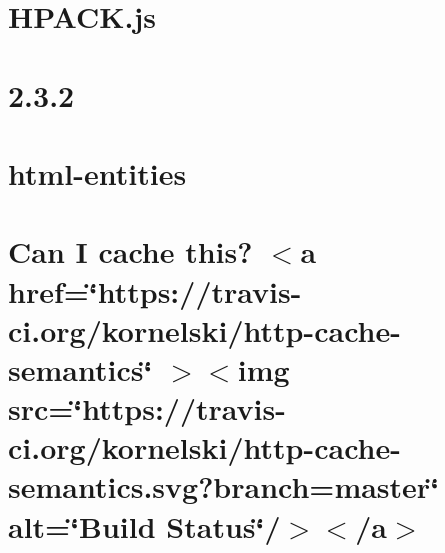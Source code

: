 \documentclass[twoside]{book}
\newcommand{\+}{\discretionary{\mbox{\scriptsize$\hookleftarrow$}}{}{}}
\begin{document}
\chapter{HPACK.\+js}
\label{md__c___users_vaishnavi_jadhav__desktop__developer_code_mean_stack_example_client_node_modules_hpack_js__r_e_a_d_m_e}

\chapter{2.3.2}
\label{md__c___users_vaishnavi_jadhav__desktop__developer_code_mean_stack_example_client_node_modules_html_entities__c_h_a_n_g_e_l_o_g}

\chapter{html-\/entities}
\label{md__c___users_vaishnavi_jadhav__desktop__developer_code_mean_stack_example_client_node_modules_html_entities__r_e_a_d_m_e}

\chapter{Can I cache this? \texorpdfstring{$<$}{<}a href=\char`\"{}https\+://travis-\/ci.\+org/kornelski/http-\/cache-\/semantics\char`\"{} \texorpdfstring{$>$}{>}\texorpdfstring{$<$}{<}img src=\char`\"{}https\+://travis-\/ci.\+org/kornelski/http-\/cache-\/semantics.\+svg?branch=master\char`\"{} alt=\char`\"{}\+Build Status\char`\"{}/\texorpdfstring{$>$}{>}\texorpdfstring{$<$}{<}/a\texorpdfstring{$>$}{>}}
\label{md__c___users_vaishnavi_jadhav__desktop__developer_code_mean_stack_example_client_node_modules_hf25aaebbc1f0c896e68fb8316b8f8f61}

\end{document}
